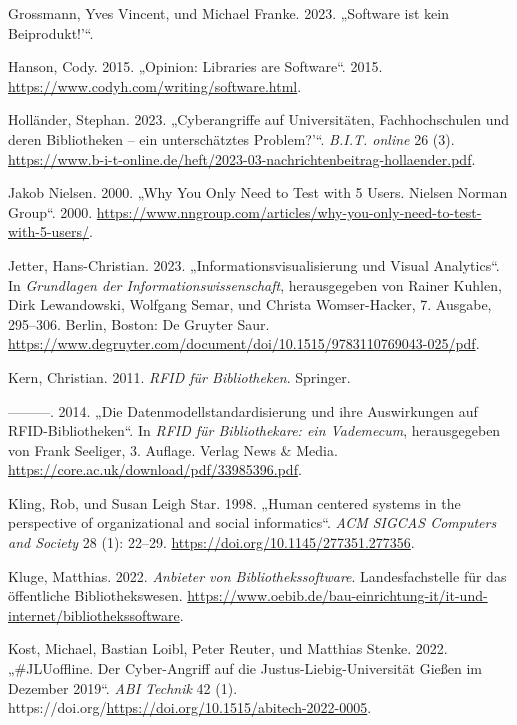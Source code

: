 \documentclass[
  11pt,
  letterpaper,
  DIV=11,
  twoside]{scrreprt}
\newlength{\cslhangindent}
\newenvironment{CSLReferences}[2] %
 {\begin{list}{}{%
  \setlength{\itemindent}{0pt}
  \setlength{\leftmargin}{0pt}
  \setlength{\parsep}{0pt}
  \ifodd #1
   \setlength{\leftmargin}{\cslhangindent}
   \setlength{\itemindent}{-1\cslhangindent}
  \fi
  \setlength{\itemsep}{#2\baselineskip}}}
 {\end{list}}
\begin{document}
\begin{CSLReferences}{1}{0}
Grossmann, Yves Vincent, und Michael Franke. 2023. {„Software ist kein
Beiprodukt!'``}.

Hanson, Cody. 2015. {„Opinion: Libraries are Software``}. 2015.
\url{https://www.codyh.com/writing/software.html}.

Holländer, Stephan. 2023. {„Cyberangriffe auf Universitäten,
Fachhochschulen und deren Bibliotheken -- ein unterschätztes
Problem?'``}. \emph{B.I.T. online} 26 (3).
\url{https://www.b-i-t-online.de/heft/2023-03-nachrichtenbeitrag-hollaender.pdf}.

Jakob Nielsen. 2000. {„Why You Only Need to Test with 5 Users. Nielsen
Norman Group``}. 2000.
\url{https://www.nngroup.com/articles/why-you-only-need-to-test-with-5-users/}.

Jetter, Hans-Christian. 2023. {„Informationsvisualisierung und Visual
Analytics``}. In \emph{Grundlagen der Informationswissenschaft},
herausgegeben von Rainer Kuhlen, Dirk Lewandowski, Wolfgang Semar, und
Christa Womser-Hacker, 7. Ausgabe, 295--306. Berlin, Boston: De Gruyter
Saur.
\url{https://www.degruyter.com/document/doi/10.1515/9783110769043-025/pdf}.

Kern, Christian. 2011. \emph{{RFID} für Bibliotheken}. Springer.

---------. 2014. {„Die Datenmodellstandardisierung und ihre Auswirkungen
auf {RFID}-Bibliotheken``}. In \emph{{RFID} für Bibliothekare: ein
Vademecum}, herausgegeben von Frank Seeliger, 3. Auflage. Verlag News \&
Media. \url{https://core.ac.uk/download/pdf/33985396.pdf}.

Kling, Rob, und Susan Leigh Star. 1998. {„Human centered systems in the
perspective of organizational and social informatics``}. \emph{{ACM}
{SIGCAS} Computers and Society} 28 (1): 22--29.
\url{https://doi.org/10.1145/277351.277356}.

Kluge, Matthias. 2022. \emph{Anbieter von Bibliothekssoftware}.
Landesfachstelle für das öffentliche Bibliothekswesen.
\url{https://www.oebib.de/bau-einrichtung-it/it-und-internet/bibliothekssoftware}.

Kost, Michael, Bastian Loibl, Peter Reuter, und Matthias Stenke. 2022.
{„\#{JLUoffline}. Der Cyber-Angriff auf die Justus-Liebig-Universität
Gießen im Dezember 2019``}. \emph{{ABI} Technik} 42 (1).
https://doi.org/\url{https://doi.org/10.1515/abitech-2022-0005}.


\end{CSLReferences}
\end{document}
